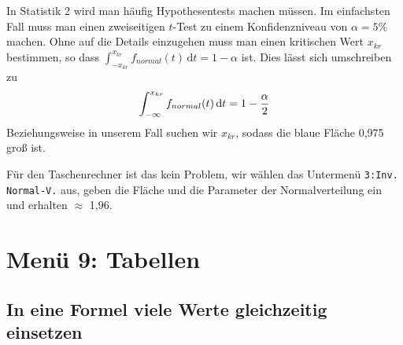 \documentclass{article}
\begin{document}
	In Statistik 2 wird man häufig Hypothesentests machen müssen. Im einfachsten Fall muss man einen zweiseitigen $t$-Test zu einem Konfidenzniveau von $\alpha = 5 \%$ machen. Ohne auf die Details einzugehen muss man einen kritischen Wert $x_{kr}$ bestimmen, so dass $\int_{-x_{kr}}^{x_{kr}} f_{normal}(t)\,\mathrm{d}t=1-\alpha$ ist. Dies lässt sich umschreiben zu
	\begin{align}
		\int_{-\infty}^{x_{kr}} f_{normal}(t)\,\mathrm{d}t = 1-\frac{\alpha}{2} \notag
	\end{align}
	Beziehungsweise in unserem Fall suchen wir $x_{kr}$, sodass die blaue Fläche 0,975 groß ist.
	\begin{center}
	\end{center}
	Für den Taschenrechner ist das kein Problem, wir wählen das Untermenü \texttt{3:Inv. Normal-V.} aus, geben die Fläche und die Parameter der Normalverteilung ein und erhalten $\approx$ 1,96.
	
	\section*{Menü 9: Tabellen}
	\subsection*{In eine Formel viele Werte gleichzeitig einsetzen}
	
\end{document}
